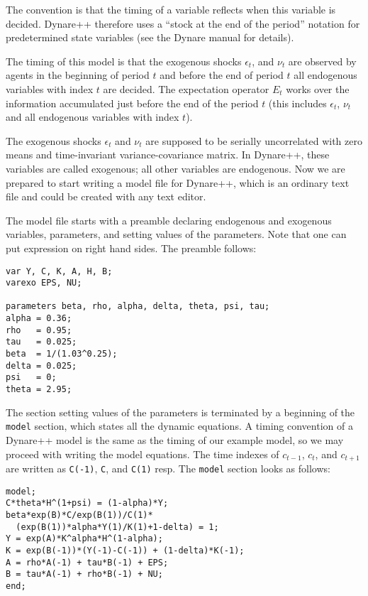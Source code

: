 \documentclass[10pt]{article}
\begin{document}
\label{timing}
The convention is that the timing of a variable reflects when this variable
is decided. Dynare++ therefore uses a ``stock at the end of the
period'' notation for predetermined state variables (see the Dynare manual for details).

The timing of this model is that the exogenous shocks $\epsilon_t$,
and $\nu_t$ are observed by agents in the beginning of period $t$ and
before the end of period $t$ all endogenous variables with index $t$
are decided. The expectation operator $E_t$ works over the information
accumulated just before the end of the period $t$ (this includes
$\epsilon_t$, $\nu_t$ and all endogenous variables with index $t$).

The exogenous shocks $\epsilon_t$ and $\nu_t$ are supposed to be
serially uncorrelated with zero means and time-invariant
variance-covariance matrix. In Dynare++, these variables are called
exogenous; all other variables are endogenous. Now we are prepared to
start writing a model file for Dynare++, which is an ordinary text
file and could be created with any text editor.

The model file starts with a preamble declaring endogenous and
exogenous variables, parameters, and setting values of the
parameters. Note that one can put expression on right hand sides. The
preamble follows:

{\small
\begin{verbatim}
var Y, C, K, A, H, B;
varexo EPS, NU;

parameters beta, rho, alpha, delta, theta, psi, tau;
alpha = 0.36;
rho   = 0.95;
tau   = 0.025;
beta  = 1/(1.03^0.25);
delta = 0.025;
psi   = 0;
theta = 2.95;
\end{verbatim}
}

The section setting values of the parameters is terminated by a
beginning of the {\tt model} section, which states all the dynamic
equations. A timing convention of a Dynare++ model is the same as the
timing of our example model, so we may proceed with writing the model
equations. The time indexes of $c_{t-1}$, $c_t$, and $c_{t+1}$ are
written as {\tt C(-1)}, {\tt C}, and {\tt C(1)} resp. The {\tt model}
section looks as follows:

{\small
\begin{verbatim}
model;
C*theta*H^(1+psi) = (1-alpha)*Y;
beta*exp(B)*C/exp(B(1))/C(1)*
  (exp(B(1))*alpha*Y(1)/K(1)+1-delta) = 1;
Y = exp(A)*K^alpha*H^(1-alpha);
K = exp(B(-1))*(Y(-1)-C(-1)) + (1-delta)*K(-1);
A = rho*A(-1) + tau*B(-1) + EPS;
B = tau*A(-1) + rho*B(-1) + NU;
end;
\end{verbatim}
}
\end{document}
